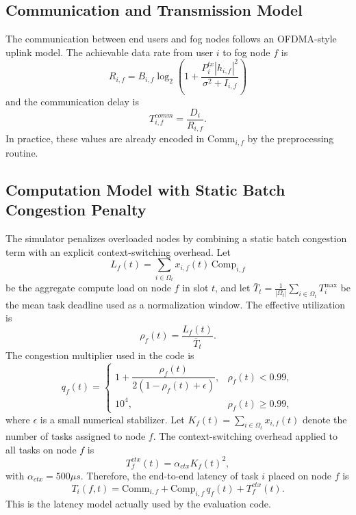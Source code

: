 \documentclass[pdflatex,sn-mathphys-num]{sn-jnl}
\begin{document}
\subsection{Communication and Transmission Model}
The communication between end users and fog nodes follows an OFDMA-style uplink model. The achievable data rate from user $i$ to fog node $f$ is
\begin{equation}
    R_{i,f} = B_{i,f} \log_2 \left( 1 + \frac{P_i^{tx} |h_{i,f}|^2}{\sigma^2 + I_{i,f}} \right)
\end{equation}
and the communication delay is
\begin{equation}
    T_{i,f}^{comm} = \frac{D_i}{R_{i,f}}.
\end{equation}
In practice, these values are already encoded in $\mathrm{Comm}_{i,f}$ by the preprocessing routine.

\subsection{Computation Model with Static Batch Congestion Penalty}
The simulator penalizes overloaded nodes by combining a static batch congestion term with an explicit context-switching overhead. Let
\begin{equation}
    L_f(t) = \sum_{i \in \Omega_t} x_{i,f}(t)\,\mathrm{Comp}_{i,f}
\end{equation}
be the aggregate compute load on node $f$ in slot $t$, and let $\bar{T}_t=\frac{1}{|\Omega_t|}\sum_{i \in \Omega_t} T_i^{\max}$ be the mean task deadline used as a normalization window. The effective utilization is
\begin{equation}
    \rho_f(t) = \frac{L_f(t)}{\bar{T}_t}.
\end{equation}
The congestion multiplier used in the code is
\begin{equation}
    q_f(t) =
    \begin{cases}
        1 + \dfrac{\rho_f(t)}{2(1-\rho_f(t)+\epsilon)}, & \rho_f(t) < 0.99,\\
        10^4, & \rho_f(t) \ge 0.99,
    \end{cases}
\end{equation}
where $\epsilon$ is a small numerical stabilizer. Let $K_f(t)=\sum_{i \in \Omega_t} x_{i,f}(t)$ denote the number of tasks assigned to node $f$. The context-switching overhead applied to all tasks on node $f$ is
\begin{equation}
    T_f^{ctx}(t) = \alpha_{ctx} K_f(t)^2,
\end{equation}
with $\alpha_{ctx}=500\mu s$. Therefore, the end-to-end latency of task $i$ placed on node $f$ is
\begin{equation}
    T_i(f,t) = \mathrm{Comm}_{i,f} + \mathrm{Comp}_{i,f}\, q_f(t) + T_f^{ctx}(t).
\end{equation}
This is the latency model actually used by the evaluation code.
\end{document}
